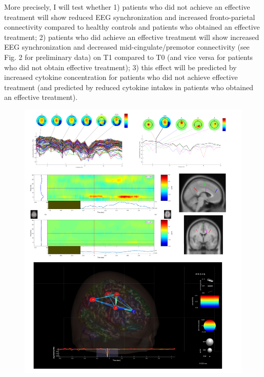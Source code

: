 \documentclass[twocolumn,  rga,issue, numeric]{jote-new-article}
\begin{document}
More precisely, I will test whether 1) patients who did not achieve an
effective treatment will show reduced EEG synchronization and increased
fronto-parietal connectivity compared to healthy controls and patients
who obtained an effective treatment; 2) patients who did achieve an
effective treatment will show increased EEG synchronization and
decreased mid-cingulate/premotor connectivity (see Fig. 2 for
preliminary data) on T1 compared to T0 (and vice versa for patients who
did not obtain effective treatment); 3) this effect will be predicted by
increased cytokine concentration for patients who did not achieve
effective treatment (and predicted by reduced cytokine intakes in
patients who obtained an effective treatment).

\begin{figure}
  \includegraphics[width=.9\linewidth]{./media/fig2.png}
  

\end{figure}
\end{document}
